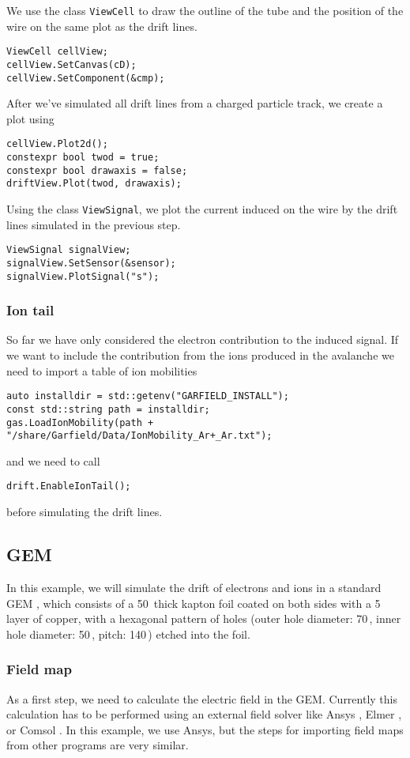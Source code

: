 We use the class \texttt{ViewCell} to draw the
outline of the tube and the position of the wire on the same plot as the
drift lines.
\begin{lstlisting}
ViewCell cellView;
cellView.SetCanvas(cD);
cellView.SetComponent(&cmp);
\end{lstlisting}
After we've simulated all drift lines from a charged particle 
track, we create a plot using
\begin{lstlisting}
cellView.Plot2d();
constexpr bool twod = true;
constexpr bool drawaxis = false;
driftView.Plot(twod, drawaxis);
\end{lstlisting}

Using the class \texttt{ViewSignal}, we plot the current induced on 
the wire by the drift lines simulated in the previous step.
\begin{lstlisting}
ViewSignal signalView;
signalView.SetSensor(&sensor);
signalView.PlotSignal("s");
\end{lstlisting}

\subsubsection{Ion tail}
So far we have only considered the electron contribution 
to the induced signal. 
If we want to include the contribution from the ions produced in 
the avalanche we need to import a table of ion mobilities
\begin{lstlisting}
auto installdir = std::getenv("GARFIELD_INSTALL");
const std::string path = installdir;
gas.LoadIonMobility(path + "/share/Garfield/Data/IonMobility_Ar+_Ar.txt");
\end{lstlisting}
and we need to call
\begin{lstlisting}
drift.EnableIonTail();
\end{lstlisting}
before simulating the drift lines.

\subsection{GEM}\label{Sec:ExampleGem}
In this example, we will simulate the drift of electrons and ions 
in a standard GEM \cite{Sauli2016}, 
which consists of a 50\, thick kapton foil 
coated on both sides with a 5\, layer of copper, 
with a hexagonal pattern of holes (outer hole diameter: 70\,, 
inner hole diameter: 50\,, pitch: 140\,) 
etched into the foil.
\subsubsection{Field map}
As a first step, we need to calculate the electric field in the GEM. 
Currently this calculation has to be performed using an external field 
solver like Ansys \cite{ANSYS}, Elmer \cite{Elmer}, or Comsol \cite{Comsol}.
In this example, 
we use Ansys, but the steps for importing field maps from other 
programs are very similar.

